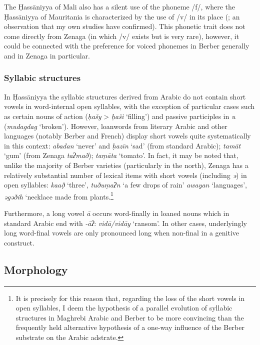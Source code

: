 \documentclass[output=paper]{langsci/langscibook}
\begin{document}
The Ḥassāniyya of Mali also has a silent use of the phoneme /f/, where the Ḥassāniyya of Mauritania is characterized by the use of /v/ in its place (\citealt{Heath2004}; an observation that my own studies have confirmed). This phonetic trait does not come directly from Zenaga (in which /v/ exists but is very rare), however, it could be connected with the preference for voiced phonemes in Berber generally and in Zenaga in particular.

\subsubsection{ Syllabic structures} %

In Ḥassāniyya the syllabic structures derived from Arabic do not contain short vowels in word-internal open syllables, with the exception of particular cases such as certain nouns of action (\textit{ḥašy} > \textit{ḥaši} ‘filling’) and passive participles in \textit{u} (\textit{mudagdag} ‘broken’). However, loanwords from literary Arabic and other languages (notably Berber and French) display short vowels quite systematically in this context: \textit{abadan} ‘never’ and \textit{ḥazīn} ‘sad’ (from standard Arabic); \textit{tamāt} ‘gum’ (from Zenaga \textit{taʔmað}); \textit{taṃāta} ‘tomato’. In fact, it may be noted that, unlike the majority of Berber varieties (particularly in the north), Zenaga has a relatively substantial number of lexical items with short vowels (including \textit{ə}) in open syllables: \textit{ka{\R}að̣} ‘three’, \textit{tuðu}\textit{ṃaʔn} ‘a few drops of rain’ \textit{awayan} ‘languages’, \textit{əgəðih} ‘necklace made from plants.\footnote{It is precisely for this reason that, regarding the loss of the short vowels in open syllables, I deem the hypothesis of a parallel evolution of syllabic structures in Maghrebi Arabic and Berber to be more convincing than the frequently held alternative hypothesis of a one-way influence of the Berber substrate on the Arabic adstrate.} 

Furthermore, a long vowel \textit{ā} occurs word-finally in loaned nouns which in standard Arabic end with \textit{{}-āʔ}: \textit{vidā/vidāy} ‘ransom’. In other cases, underlyingly long word-final vowels are only pronounced long when non-final in a genitive construct.

\subsection{ Morphology} %
\end{document}
